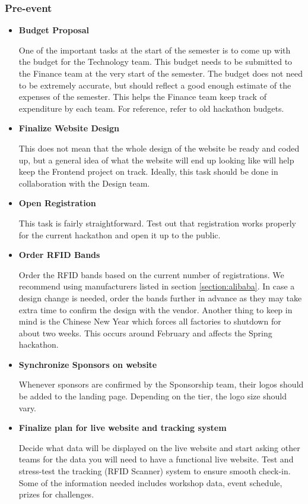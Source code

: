 \documentclass[twoside, 12pt]{article}
\newenvironment{tightitemize} %
{\begin{itemize}\itemsep1pt \parskip0pt \parsep0pt}
{\end{itemize}\vspace{-\topsep}}
\begin{document}
\subsubsection{Pre-event}
\begin{tightitemize}
    \item \textbf{Budget Proposal}
    \par One of the important tasks at the start of the semester is to come up with the budget for the Technology team. This budget needs to be submitted to the Finance team at the very start of the semester. The budget does not need to be extremely accurate, but should reflect a good enough estimate of the expenses of the semester. This helps the Finance team keep track of expenditure by each team. For reference, refer to old hackathon budgets.
    
    \item \textbf{Finalize Website Design}
    \par This does not mean that the whole design of the website be ready and coded up, but a general idea of what the website will end up looking like will help keep the Frontend project on track. Ideally, this task should be done in collaboration with the Design team.
    
    \item \textbf{Open Registration}
    \par This task is fairly straightforward. Test out that registration works properly for the current hackathon and open it up to the public.
    
    \item \textbf{Order RFID Bands}
    \par Order the RFID bands based on the current number of registrations. We recommend using manufacturers listed in section \ref{section:alibaba}. In case a design change is needed, order the bands further in advance as they may take extra time to confirm the design with the vendor. Another thing to keep in mind is the Chinese New Year which forces all factories to shutdown for about two weeks. This occurs around February and affects the Spring hackathon.
    
    \item \textbf{Synchronize Sponsors on website}
    \par Whenever sponsors are confirmed by the Sponsorship team, their logos should be added to the landing page. Depending on the tier, the logo size should vary.
    
    \item \textbf{Finalize plan for live website and tracking system}
    \par Decide what data will be displayed on the live website and start asking other teams for the data you will need to have a functional live website. Test and stress-test the tracking (RFID Scanner) system to ensure smooth check-in.  Some of the information needed includes workshop data, event schedule, prizes for challenges.
    

\end{tightitemize}
\end{document}
